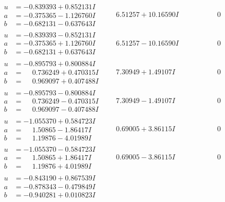 \documentclass[1p]{elsarticle_modified}
\theoremstyle{definition}
\begin{document}
$$\begin{array}{c|c|c}
\begin{aligned}
u &= -0.839393 + 0.852131 I \\
a &= -0.375365 - 1.126760 I \\
b &= -0.682131 - 0.637643 I\end{aligned}
 & \phantom{-}6.51257 + 10.16590 I & \phantom{-0.000000 } 0 \\ \hline\begin{aligned}
u &= -0.839393 - 0.852131 I \\
a &= -0.375365 + 1.126760 I \\
b &= -0.682131 + 0.637643 I\end{aligned}
 & \phantom{-}6.51257 - 10.16590 I & \phantom{-0.000000 } 0 \\ \hline\begin{aligned}
u &= -0.895793 + 0.800884 I \\
a &= \phantom{-}0.736249 + 0.470315 I \\
b &= \phantom{-}0.969097 + 0.407488 I\end{aligned}
 & \phantom{-}7.30949 + 1.49107 I & \phantom{-0.000000 } 0 \\ \hline\begin{aligned}
u &= -0.895793 - 0.800884 I \\
a &= \phantom{-}0.736249 - 0.470315 I \\
b &= \phantom{-}0.969097 - 0.407488 I\end{aligned}
 & \phantom{-}7.30949 - 1.49107 I & \phantom{-0.000000 } 0 \\ \hline\begin{aligned}
u &= -1.055370 + 0.584723 I \\
a &= \phantom{-}1.50865 - 1.86417 I \\
b &= \phantom{-}1.19876 - 4.01989 I\end{aligned}
 & \phantom{-}0.69005 + 3.86115 I & \phantom{-0.000000 } 0 \\ \hline\begin{aligned}
u &= -1.055370 - 0.584723 I \\
a &= \phantom{-}1.50865 + 1.86417 I \\
b &= \phantom{-}1.19876 + 4.01989 I\end{aligned}
 & \phantom{-}0.69005 - 3.86115 I & \phantom{-0.000000 } 0 \\ \hline\begin{aligned}
u &= -0.843190 + 0.867539 I \\
a &= -0.878343 - 0.479849 I \\
b &= -0.940281 + 0.010823 I\end{aligned}

\end{array}$$
\end{document}
